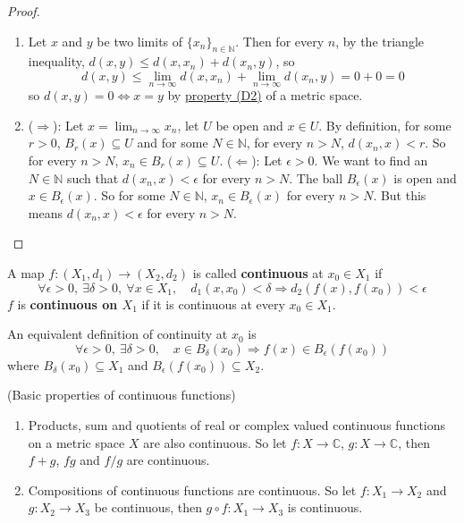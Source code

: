 \begin{proof}
	\hfill
	\begin{enumerate}
		\item Let $x$ and $y$ be two limits of $\{ x_n \}_{n \in \mathbb{N}}$. Then for every $n$, by the triangle inequality, $d(x, y) \le d(x, x_n) + d(x_n, y)$, so
		\[
			d(x, y) \le \lim_{n \rightarrow \infty} d(x, x_n) + \lim_{n \rightarrow \infty} d(x_n, y) = 0 + 0 = 0
		\]
		so $d(x, y) = 0 \Longleftrightarrow x = y$ by \hyperref[def:metricSpace]{property (D2)} of a metric space.
		\item ($\Rightarrow$): Let $x = \lim_{n \rightarrow \infty} x_n$, let $U$ be open and $x \in U$. By definition, for some $r > 0$, $B_r(x) \subseteq U$ and for some $N \in \mathbb{N}$, for every $n > N$, $d(x_n, x) < r$. So for every $n > N$, $x_n \in B_r(x) \subseteq U$.
		($\Leftarrow$): Let $\epsilon > 0$. We want to find an $N \in \mathbb{N}$ such that $d(x_n, x) < \epsilon$ for every $n > N$. The ball $B_{\epsilon}(x)$ is open and $x \in B_{\epsilon}(x)$. So for some $N \in \mathbb{N}$, $x_n \in B_{\epsilon}(x)$ for every $n > N$. But this means $d(x_n, x) < \epsilon$ for every $n > N$.
	\end{enumerate}
\end{proof}

\begin{definition}\label{def:continuousMap}
	A map $f: (X_1, d_1) \rightarrow (X_2, d_2)$ is called \textbf{continuous} at $x_0 \in X_1$ if
	\[
		\forall \epsilon > 0, \ \exists \delta > 0, \ \forall x \in X_1, \quad d_1(x, x_0) < \delta \Longrightarrow d_2(f(x), f(x_0)) < \epsilon
	\]
	$f$ is \textbf{continuous on $X_1$} if it is continuous at every $x_0 \in X_1$.
\end{definition}

\begin{remark}
	An equivalent definition of continuity at $x_0$ is
	\[
		\forall \epsilon > 0, \ \exists \delta > 0, \quad x \in B_{\delta}(x_0) \Longrightarrow f(x) \in B_{\epsilon}(f(x_0))
	\]
	where $B_{\delta}(x_0) \subseteq X_1$ and $B_{\epsilon}(f(x_0)) \subseteq X_2$.
\end{remark}

\begin{lemma}\label{lem:continuousFunctionsBasicProperties}
	(Basic properties of continuous functions)
	\begin{enumerate}
		\item Products, sum and quotients of real or complex valued continuous functions on a metric space $X$ are also continuous. So let $f: X \rightarrow \mathbb{C}$, $g: X \rightarrow \mathbb{C}$, then $f + g$, $fg$ and $f / g$ are continuous.
		\item Compositions of continuous functions are continuous. So let $f: X_1 \rightarrow X_2$ and $g: X_2 \rightarrow X_3$ be continuous, then $g \circ f: X_1 \rightarrow X_3$ is continuous.
	\end{enumerate}
\end{lemma}

